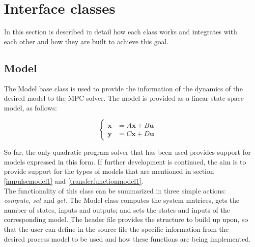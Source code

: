 \section{Interface classes}

In this section is described in detail how each class works and integrates with each other and how they are built to achieve this goal. 

\subsection{Model}

The Model base class is used to provide the information of the dynamics of the desired model to the MPC solver. The model is provided as a linear state space model, as follows:

\begin{equation} \label{eq:model_representation}
\begin{cases}
\dot{\mathbf{x}} &= A\mathbf{x} + B\mathbf{u} \\
\mathbf{y} &= C\mathbf{x} + D\mathbf{u}
\end{cases}
\end{equation} 

So far, the only quadratic program solver that has been used provides support for models expressed in this form. If further development is continued, the aim is to provide support for the types of models that are mentioned in section \ref{impulsemodel1} and \ref{transferfunctionmodel1}.\\

The functionality of this class can be summarized in three simple actions: \emph{compute}, \emph{set} and \emph{get}. The Model class computes the system matrices, gets the number of states, inputs and outputs; and sets the states and inputs of the corresponding model. The header file provides the structure to build up upon, so that the user can define in the source file the specific information from the desired process model to be used and how these functions are being implemented. 

